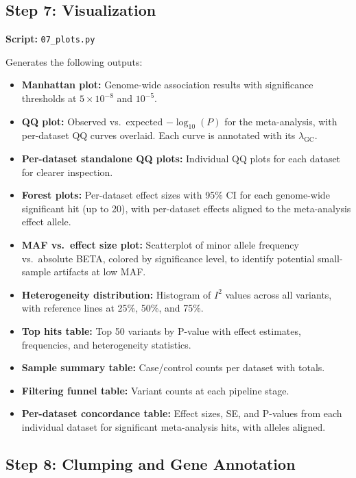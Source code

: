 \documentclass[11pt,letterpaper]{article}
\begin{document}
\subsection{Step 7: Visualization}
\label{sec:step7}

\textbf{Script:} \texttt{07\_plots.py}

Generates the following outputs:

\begin{itemize}[nosep]
    \item \textbf{Manhattan plot:} Genome-wide association results with significance thresholds at $5 \times 10^{-8}$ and $10^{-5}$.
    \item \textbf{QQ plot:} Observed vs.\ expected $-\log_{10}(P)$ for the meta-analysis, with per-dataset QQ curves overlaid. Each curve is annotated with its $\lambda_\text{GC}$.
    \item \textbf{Per-dataset standalone QQ plots:} Individual QQ plots for each dataset for clearer inspection.
    \item \textbf{Forest plots:} Per-dataset effect sizes with 95\% CI for each genome-wide significant hit (up to 20), with per-dataset effects aligned to the meta-analysis effect allele.
    \item \textbf{MAF vs.\ effect size plot:} Scatterplot of minor allele frequency vs.\ absolute BETA, colored by significance level, to identify potential small-sample artifacts at low MAF.
    \item \textbf{Heterogeneity distribution:} Histogram of $I^2$ values across all variants, with reference lines at 25\%, 50\%, and 75\%.
    \item \textbf{Top hits table:} Top 50 variants by P-value with effect estimates, frequencies, and heterogeneity statistics.
    \item \textbf{Sample summary table:} Case/control counts per dataset with totals.
    \item \textbf{Filtering funnel table:} Variant counts at each pipeline stage.
    \item \textbf{Per-dataset concordance table:} Effect sizes, SE, and P-values from each individual dataset for significant meta-analysis hits, with alleles aligned.
\end{itemize}

\subsection{Step 8: Clumping and Gene Annotation}
\label{sec:step8}
\end{document}

